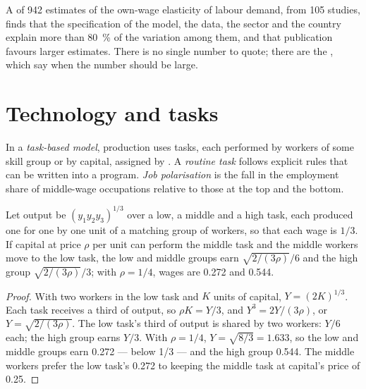 \begin{measure}
A  of 942 estimates of the own-wage elasticity of labour demand, from
105 studies, finds that the specification of the model, the data, the sector and the
country explain more than 80~\% of the variation among them, and that publication
favours larger estimates. %
There is no single number to quote; there are the , which say
when the number should be large.
\end{measure}

\section{Technology and tasks}\label{sec:b3:labour-supply-and-demand:tasks}

\begin{definition}\label{def:b3:labour-supply-and-demand:tasks}
In a \emph{task-based model}, production uses tasks, each performed by workers of
some skill group or by capital, assigned by . A \emph{routine
task} follows explicit rules that can be written into a program. \emph{Job
polarisation} is the fall in the employment share of middle-wage occupations
relative to those at the top and the bottom.
\end{definition}

\begin{proposition}\label{prop:b3:labour-supply-and-demand:automation}
Let output be $(y_1y_2y_3)^{1/3}$ over a low, a middle and a high task, each produced one for one by
one unit of a matching group of workers, so that each wage is $1/3$. If capital at price
$\rho$ per unit can perform the middle task and the middle workers move to the low task,
the low and middle groups earn $\sqrt{2/(3\rho)}/6$ and the high group $\sqrt{2/(3\rho)}/3$; with $\rho = 1/4$, wages are
0.272 and 0.544.
\end{proposition}

\begin{proof}
With two workers in the low task and $K$ units of capital, $Y = (2K)^{1/3}$. Each task receives a third
of output, so $\rho K = Y/3$, and $Y^3 = 2Y/(3\rho)$, or $Y = \sqrt{2/(3\rho)}$. The low task's third of output is shared by two
workers: $Y/6$ each; the high group earns $Y/3$. With $\rho = 1/4$, $Y = \sqrt{8/3} = 1.633$, so the low and middle
groups earn 0.272 --- below 1/3 --- and the high group 0.544. The middle workers prefer the
low task's 0.272 to keeping the middle task at capital's price of 0.25.
\end{proof}

